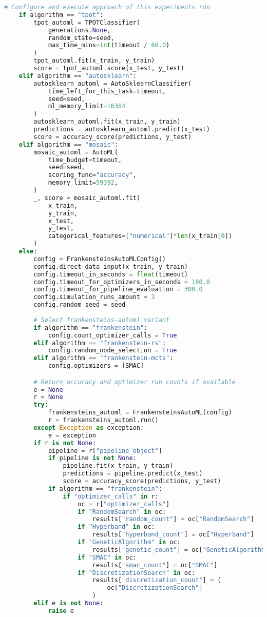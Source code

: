 \begin{lstlisting}[language=Python,basicstyle=\scriptsize]
    # Configure and execute approach of this experiments run
    if algorithm == "tpot":
        tpot_automl = TPOTClassifier(
            generations=None,
            random_state=seed,
            max_time_mins=int(timeout / 60.0)
        )
        tpot_automl.fit(x_train, y_train)
        score = tpot_automl.score(x_test, y_test)
    elif algorithm == "autosklearn":
        autosklearn_automl = AutoSklearnClassifier(
            time_left_for_this_task=timeout,
            seed=seed,
            ml_memory_limit=16384
        )
        autosklearn_automl.fit(x_train, y_train)
        predictions = autosklearn_automl.predict(x_test)
        score = accuracy_score(predictions, y_test)
    elif algorithm == "mosaic":
        mosaic_automl = AutoML(
            time_budget=timeout,
            seed=seed,
            scoring_func="accuracy",
            memory_limit=59392,
        )
        _, score = mosaic_automl.fit(
            x_train,
            y_train,
            x_test,
            y_test,
            categorical_features=["numerical"]*len(x_train[0])
        )
    else:
        config = FrankensteinsAutoMLConfig()
        config.direct_data_input(x_train, y_train)
        config.timeout_in_seconds = float(timeout)
        config.timeout_for_optimizers_in_seconds = 180.0
        config.timeout_for_pipeline_evaluation = 300.0
        config.simulation_runs_amount = 3
        config.random_seed = seed
        
        # Select frankensteins-automl variant
        if algorithm == "frankenstein":
            config.count_optimizer_calls = True
        elif algorithm == "frankenstein-rs":
            config.random_node_selection = True
        elif algorithm == "frankenstein-mcts":
            config.optimizers = [SMAC]

        # Return accuracy and optimizer run counts if available
        e = None
        r = None
        try:
            frankensteins_automl = FrankensteinsAutoML(config)
            r = frankensteins_automl.run()
        except Exception as exception:
            e = exception
        if r is not None:
            pipeline = r["pipeline_object"]
            if pipeline is not None:
                pipeline.fit(x_train, y_train)
                predictions = pipeline.predict(x_test)
                score = accuracy_score(predictions, y_test)
            if algorithm == "frankenstein":
                if "optimizer_calls" in r:
                    oc = r["optimizer_calls"]
                    if "RandomSearch" in oc:
                        results["random_count"] = oc["RandomSearch"]
                    if "Hyperband" in oc:
                        results["hyperband_count"] = oc["Hyperband"]
                    if "GeneticAlgorithm" in oc:
                        results["genetic_count"] = oc["GeneticAlgorithm"]
                    if "SMAC" in oc:
                        results["smac_count"] = oc["SMAC"]
                    if "DiscretizationSearch" in oc:
                        results["discretization_count"] = (
                            oc["DiscretizationSearch"]
                        )
        elif e is not None:
            raise e


\end{lstlisting}
